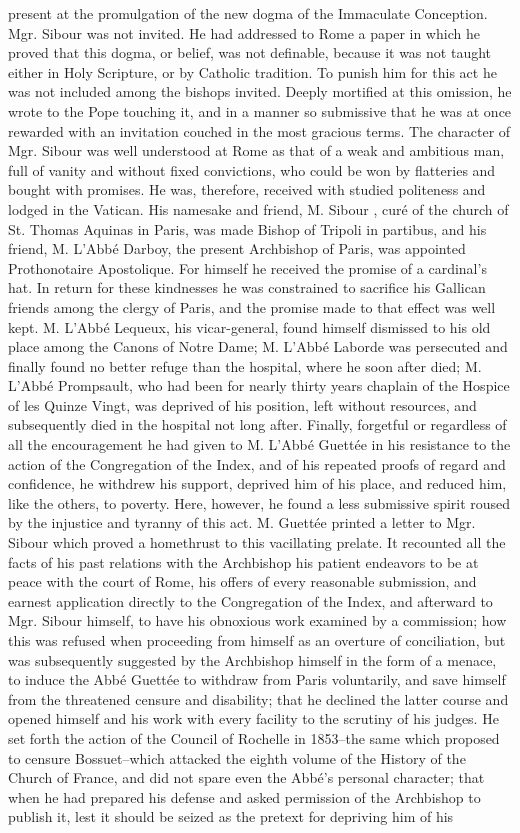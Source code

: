 present at the promulgation of the new dogma of the Immaculate Conception. Mgr. Sibour was not invited. He had addressed to Rome a paper in which he proved that this dogma, or belief, was not definable, because it was not taught either in Holy Scripture, or by Catholic tradition. To punish him for this act he was not included among the bishops invited. Deeply mortified at this omission, he wrote to the Pope touching it, and in a manner so submissive that he was at once rewarded with an invitation couched in the most gracious terms. The character of Mgr. Sibour was well understood at Rome as that of a weak and ambitious man, full of vanity and without fixed convictions, who could be won by flatteries and bought with promises. He was, therefore, received with studied politeness and lodged in the Vatican. His namesake and friend, M. Sibour , curé of the church of St. Thomas Aquinas in Paris, was made Bishop of Tripoli in partibus, and his friend, M. L'Abbé Darboy, the present Archbishop of Paris, was appointed Prothonotaire Apostolique. For himself he received the promise of a cardinal’s hat. In return for these kindnesses he was constrained to sacrifice his Gallican friends among the clergy of Paris, and the promise made to that effect was well kept. M. L'Abbé Lequeux, his vicar-general, found himself dismissed to his old place among the Canons of Notre Dame; M. L'Abbé Laborde was persecuted and finally found no better refuge than the hospital, where he soon after died; M. L'Abbé Prompsault, who had been for nearly thirty years chaplain of the Hospice of les Quinze Vingt, was deprived of his position, left without resources, and subsequently died in the hospital not long after. Finally, forgetful or regardless of all the encouragement he had given to M. L’Abbé Guettée in his resistance to the action of the Congregation of the Index, and of his repeated proofs of regard and confidence, he withdrew his support, deprived him of his place, and reduced him, like the others, to poverty. Here, however, he found a less submissive spirit roused by the injustice and tyranny of this act. M. Guettée printed a letter to Mgr. Sibour which proved a homethrust to this vacillating prelate. It recounted all the facts of his past relations with the Archbishop his patient endeavors to be at peace with the court of Rome, his offers of every reasonable submission, and earnest application directly to the Congregation of the Index, and afterward to Mgr. Sibour himself, to have his obnoxious work examined by a commission; how this was refused when proceeding from himself as an overture of conciliation, but was subsequently suggested by the Archbishop himself in the form of a menace, to induce the Abbé Guettée to withdraw from Paris voluntarily, and save himself from the threatened censure and disability; that he declined the latter course and opened himself and his work with every facility to the scrutiny of his judges. He set forth the action of the Council of Rochelle in 1853--the same which proposed to censure Bossuet--which attacked the eighth volume of the History of the Church of France, and did not spare even the Abbé's personal character; that when he had prepared his defense and asked permission of the Archbishop to publish it, lest it should be seized as the pretext for depriving him of his 